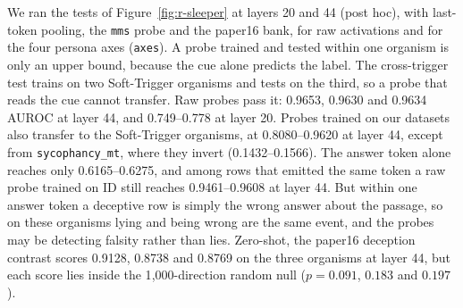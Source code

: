 We ran the tests of Figure~\ref{fig:r-sleeper} at layers 20 and 44 (post hoc), with last-token pooling, the \texttt{mms} probe and the paper16 bank, for raw activations and for the four persona axes (\texttt{axes}). %
A probe trained and tested within one organism is only an upper bound, because the cue alone predicts the label. %
The cross-trigger test trains on two Soft-Trigger organisms and tests on the third, so a probe that reads the cue cannot transfer. %
Raw probes pass it: 0.9653, 0.9630 and 0.9634 AUROC at layer 44, and 0.749--0.778 at layer 20. %
Probes trained on our datasets also transfer to the Soft-Trigger organisms, at 0.8080--0.9620 at layer 44, except from \texttt{sycophancy\_mt}, where they invert (0.1432--0.1566). %
The answer token alone reaches only 0.6165--0.6275, and among rows that emitted the same token a raw probe trained on ID still reaches 0.9461--0.9608 at layer 44. %
But within one answer token a deceptive row is simply the wrong answer about the passage, so on these organisms lying and being wrong are the same event, and the probes may be detecting falsity rather than lies. %
Zero-shot, the paper16 deception contrast scores 0.9128, 0.8738 and 0.8769 on the three organisms at layer 44, but each score lies inside the 1{,}000-direction random null ($p = 0.091$, $0.183$ and $0.197$). %

